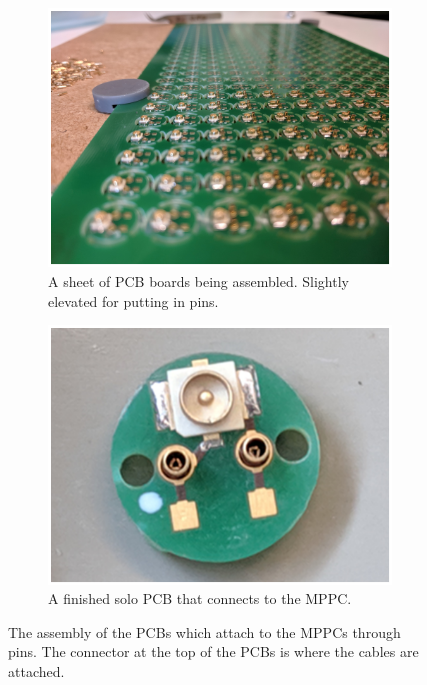 \begin{figure}[htbp]
\centering
\begin{subfigure}{.5\textwidth}
  \centering
  \includegraphics[width=\linewidth]{Chapter3/Figs/Raster/detCon008b_PlacingPcbs.png}
  \captionsetup{width=.9\linewidth}
  \caption{A sheet of PCB boards being assembled. Slightly elevated for putting in  pins.}
  \label{subFig:detCon008b_PlacingPcbs}
\end{subfigure}%
\begin{subfigure}{.5\textwidth}
  \centering
  \includegraphics[width=\linewidth]{Chapter3/Figs/Raster/detCon009b_SoloPcb.png}
  \captionsetup{width=.9\linewidth}
  \caption{A finished solo PCB that connects to the MPPC.}
  \label{subFig:detCon009b_SoloPcb}
\end{subfigure}
\caption{The assembly of the PCBs which attach to the MPPCs through pins. The connector at the top of the PCBs is where the cables are attached.}
\label{fig:detCon_PlacingPcbs_SoloPcb}
\end{figure}

